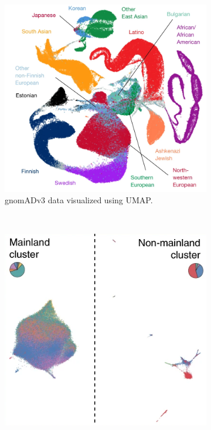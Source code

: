\documentclass[12pt]{article}
\newcommand{\rulesep}{\unskip\ \vrule\ }
\begin{document}
\begin{figure}[h!]
  \centering
  \begin{subfigure}[b]{0.49\linewidth}
    \includegraphics[width=\linewidth]{external_images/gnomAD_umap.png}
    \caption{gnomADv3 data visualized using UMAP.}
    \label{fig:gnomAD_UMAP}
  \end{subfigure}
  \rulesep
  \begin{subfigure}[b]{0.49\linewidth}
    \includegraphics[width=\linewidth]{external_images/BBJ_UMAP.png}

\end{subfigure}
\end{figure}
\end{document}
